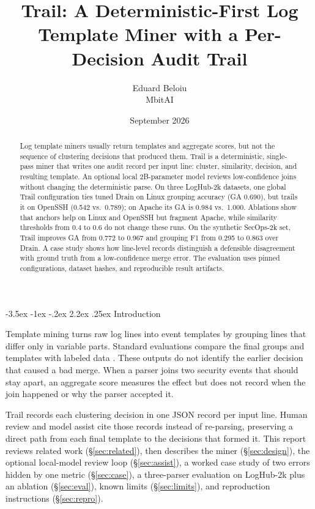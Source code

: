 \documentclass[11pt]{article}
\title{Trail: A Deterministic-First Log Template Miner with a Per-Decision Audit Trail}
\author{Eduard Beloiu \\ \small MbitAI}
\date{September 2026}
\makeatletter
\renewcommand\section{\@startsection{section}{1}{\z@}%
  {-3.5ex \@plus -1ex \@minus -.2ex}%
  {2.2ex \@plus .25ex}%
  {\normalfont\Large\bfseries}}
\makeatother
\begin{document}
\maketitle

\begin{abstract}
Log template miners usually return templates and aggregate scores, but
not the sequence of clustering decisions that produced them. Trail is
a deterministic, single-pass miner that writes one audit record per
input line: cluster, similarity, decision, and resulting template. An
optional local 2B-parameter model reviews low-confidence joins without
changing the deterministic parse. On three LogHub-2k datasets, one
global Trail configuration ties tuned Drain on Linux grouping accuracy
(GA 0.690), but trails it on OpenSSH (0.542 vs.\ 0.789); on Apache its
GA is 0.984 vs.\ 1.000. Ablations show that anchors help on Linux and
OpenSSH but fragment Apache, while similarity thresholds from 0.4 to
0.6 do not change these runs. On the synthetic SecOps-2k set, Trail
improves GA from 0.772 to 0.967 and grouping F1 from 0.295 to 0.863
over Drain. A case study shows how line-level records distinguish a
defensible disagreement with ground truth from a low-confidence merge
error. The evaluation uses pinned configurations, dataset hashes, and
reproducible result artifacts.
\end{abstract}

\section{Introduction}

Template mining turns raw log lines into event templates by grouping
lines that differ only in variable parts. Standard evaluations compare
the final groups and templates with labeled data
\cite{jiang2024, zhu2023}. These outputs do not identify the earlier
decision that caused a bad merge. When a parser joins two security
events that should stay apart, an aggregate score measures the effect
but does not record when the join happened or why the parser accepted
it.

Trail records each clustering decision in one JSON record per input
line. Human review and model assist cite those records instead of
re-parsing, preserving a direct path from each final template to the
decisions that formed it. This report reviews related work
(\S\ref{sec:related}), then describes the miner (\S\ref{sec:design}),
the optional local-model review loop (\S\ref{sec:assist}), a worked
case study of two errors hidden by one metric
(\S\ref{sec:case}), a three-parser evaluation on LogHub-2k plus an
ablation (\S\ref{sec:eval}), known limits (\S\ref{sec:limits}), and
reproduction instructions (\S\ref{sec:repro}).
\end{document}
